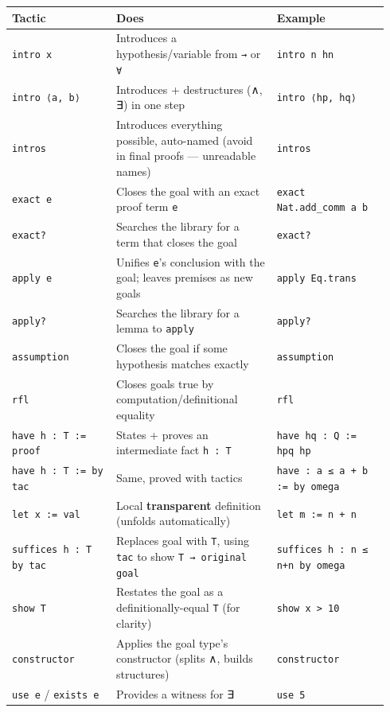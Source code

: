 \begin{center}
\begin{tabular}{@{}p{0.26\linewidth}p{0.40\linewidth}p{0.28\linewidth}@{}}
\hline
\textbf{Tactic} & \textbf{Does} & \textbf{Example} \\
\hline
\texttt{intro x} & Introduces a hypothesis/variable from \texttt{→} or \texttt{∀} & \texttt{intro n hn} \\
\texttt{intro ⟨a, b⟩} & Introduces + destructures (∧, ∃) in one step & \texttt{intro ⟨hp, hq⟩} \\
\texttt{intros} & Introduces everything possible, auto-named (avoid in final proofs --- unreadable names) & \texttt{intros} \\
\texttt{exact e} & Closes the goal with an exact proof term \texttt{e} & \texttt{exact Nat.add\_comm a b} \\
\texttt{exact?} & Searches the library for a term that closes the goal & \texttt{exact?} \\
\texttt{apply e} & Unifies \texttt{e}'s conclusion with the goal; leaves premises as new goals & \texttt{apply Eq.trans} \\
\texttt{apply?} & Searches the library for a lemma to \texttt{apply} & \texttt{apply?} \\
\texttt{assumption} & Closes the goal if some hypothesis matches exactly & \texttt{assumption} \\
\texttt{rfl} & Closes goals true by computation/definitional equality & \texttt{rfl} \\
\texttt{have h : T := proof} & States + proves an intermediate fact \texttt{h : T} & \texttt{have hq : Q := hpq hp} \\
\texttt{have h : T := by tac} & Same, proved with tactics & \texttt{have : a ≤ a + b := by omega} \\
\texttt{let x := val} & Local \textbf{transparent} definition (unfolds automatically) & \texttt{let m := n + n} \\
\texttt{suffices h : T by tac} & Replaces goal with \texttt{T}, using \texttt{tac} to show \texttt{T → original goal} & \texttt{suffices h : n ≤ n+n by omega} \\
\texttt{show T} & Restates the goal as a definitionally-equal \texttt{T} (for clarity) & \texttt{show x > 10} \\
\texttt{constructor} & Applies the goal type's constructor (splits ∧, builds structures) & \texttt{constructor} \\
\texttt{use e} / \texttt{exists e} & Provides a witness for ∃ & \texttt{use 5} \\
\hline
\end{tabular}
\end{center}

